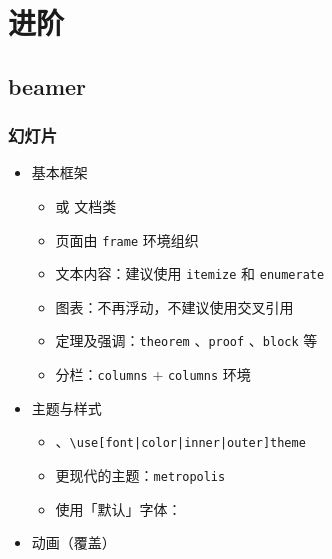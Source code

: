 \section{进阶}
\subsection{beamer}
\begin{frame}[fragile]
  \frametitle{幻灯片}
  \begin{itemize}
    \item<+-> 基本框架
  
      \begin{itemize}
        \item {} 或  文档类
        \item 页面由 \texttt{frame}  环境组织
        \item 文本内容：建议使用 \texttt{itemize} 和 \texttt{enumerate}
        \item 图表：不再浮动，不建议使用交叉引用
        \item 定理及强调：\texttt{theorem} 、\texttt{proof} 、\texttt{block} 等
        \item 分栏：\texttt{columns} + \texttt{columns} 环境
      \end{itemize}
  
    \item<+-> 主题与样式
  
      \begin{itemize}
        \item \texttt{\usetheme}、\texttt{\lstinline[style=style@inline]+\use[font|color|inner|outer]theme+}
        \item 更现代的主题：\texttt{metropolis}
        \item 使用「默认」字体：\texttt{}
      \end{itemize}
  
    \item<+-> 动画（覆盖）
  
  \end{itemize}
\end{frame}
  
